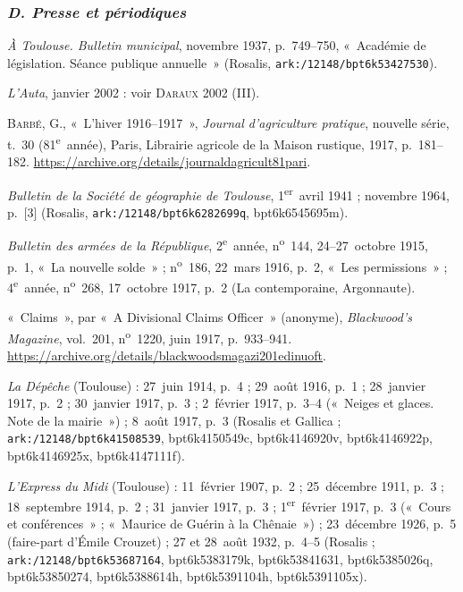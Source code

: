\subsubsection*{\normalsize\mdseries\itshape D. Presse et périodiques}

\begin{biblist}
\item \textit{À Toulouse. Bulletin municipal}, novembre 1937, p.~749--750, «~Académie de législation. Séance publique annuelle~» (Rosalis, \nolinkurl{ark:/12148/bpt6k53427530}).
\item \textit{L'Auta}, janvier 2002 : voir \textsc{Daraux} 2002 (III).
\item \textsc{Barbé}, G., «~L'hiver 1916--1917~», \textit{Journal d'agriculture pratique}, nouvelle série, t.~30 (81\textsuperscript{e}~année), Paris, Librairie agricole de la Maison rustique, 1917, p.~181--182. \url{https://archive.org/details/journaldagricult81pari}.
\item \textit{Bulletin de la Société de géographie de Toulouse}, 1\textsuperscript{er}~avril 1941 ; novembre 1964, p.~[3] (Rosalis, \nolinkurl{ark:/12148/bpt6k6282699q}, bpt6k6545695m).
\item \textit{Bulletin des armées de la République}, 2\textsuperscript{e}~année, n\textsuperscript{o}~144, 24--27~octobre 1915, p.~1, «~La nouvelle solde~» ; n\textsuperscript{o}~186, 22~mars 1916, p.~2, «~Les permissions~» ; 4\textsuperscript{e}~année, n\textsuperscript{o}~268, 17~octobre 1917, p.~2 (La contemporaine, Argonnaute).
\item «~Claims~», par «~A Divisional Claims Officer~» (anonyme), \textit{Blackwood's Magazine}, vol.~201, n\textsuperscript{o}~1220, juin 1917, p.~933--941. \url{https://archive.org/details/blackwoodsmagazi201edinuoft}.
\item \textit{La Dépêche} (Toulouse) : 27~juin 1914, p.~4 ; 29~août 1916, p.~1 ; 28~janvier 1917, p.~2 ; 30~janvier 1917, p.~3 ; 2~février 1917, p.~3--4 («~Neiges et glaces. Note de la mairie~») ; 8~août 1917, p.~3 (Rosalis et Gallica ; \nolinkurl{ark:/12148/bpt6k41508539}, bpt6k4150549c, bpt6k4146920v, bpt6k4146922p, bpt6k4146925x, bpt6k4147111f).
\item \textit{L'Express du Midi} (Toulouse) : 11~février 1907, p.~2 ; 25~décembre 1911, p.~3 ; 18~septembre 1914, p.~2 ; 31~janvier 1917, p.~3 ; 1\textsuperscript{er}~février 1917, p.~3 («~Cours et conférences~» ; «~Maurice de Guérin à la Chênaie~») ; 23~décembre 1926, p.~5 (faire-part d'Émile Crouzet) ; 27 et 28~août 1932, p.~4--5 (Rosalis ; \nolinkurl{ark:/12148/bpt6k53687164}, bpt6k5383179k, bpt6k53841631, bpt6k5385026q, bpt6k53850274, bpt6k5388614h, bpt6k5391104h, bpt6k5391105x).

\end{biblist}
